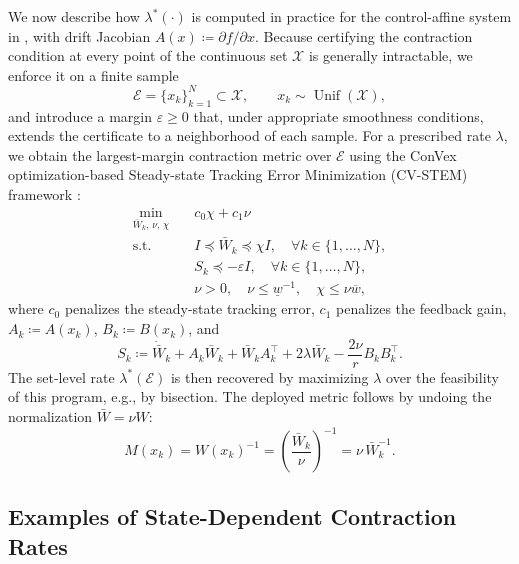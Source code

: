 \documentclass[lettersize,journal]{IEEEtran}
\begin{document}
We now describe how $\lambda^*(\cdot)$ is computed in practice for the
control-affine system in , with drift Jacobian
$A(x)\coloneq\partial f/\partial x$. Because certifying the contraction
condition at every point of the continuous set $\mathcal{X}$ is generally
intractable, we enforce it on a finite sample
\begin{equation}
    \mathcal{E} = \{x_k\}_{k=1}^{N}\subset\mathcal{X},
    \qquad
    x_k\sim\operatorname{Unif}(\mathcal{X}),
\end{equation}
and introduce a margin $\varepsilon\geq0$ that, under appropriate smoothness
conditions, extends the certificate to a neighborhood of each sample. For a
prescribed rate $\lambda$, we obtain the largest-margin contraction metric over
$\mathcal{E}$ using the ConVex optimization-based Steady-state Tracking Error
Minimization (CV-STEM) framework \cite{tsukamoto2020robust}:
\begin{align}
    \min_{\bar{W}_k,\,\nu,\,\chi} \quad & c_0\chi + c_1\nu \label{eqn:cvstem1}\\
    \text{s.t.} \quad & I \preceq \bar{W}_k \preceq \chi I, \quad \forall k \in \{1,\dots,N\}, \label{eqn:cvstem2}\\
    & S_k \preceq -\varepsilon I, \quad \forall k \in \{1,\dots,N\}, \label{eqn:cvstem3}\\
    & \nu > 0, \quad \nu \leq \underline{w}^{-1}, \quad \chi \leq \nu \overline{w},\label{eqn:cvstem4}
\end{align}
where $c_0$ penalizes the steady-state tracking error, $c_1$ penalizes the
feedback gain, $A_k\coloneq A(x_k)$, $B_k\coloneq B(x_k)$, and
\begin{equation}
    S_k \coloneq \dot{\bar{W}}_k + A_k \bar{W}_k + \bar{W}_k A_k^\top
    + 2\lambda \bar{W}_k - \frac{2\nu}{r}B_k B_k^\top.
\end{equation}
The set-level rate $\lambda^*(\mathcal{E})$ is then recovered by maximizing
$\lambda$ over the feasibility of this program, e.g., by bisection. The deployed
metric follows by undoing the normalization $\bar{W}=\nu W$:
\begin{equation}
    M(x_k) = W(x_k)^{-1} = \left(\frac{\bar{W}_k}{\nu}\right)^{-1} = \nu\,\bar{W}_k^{-1}.
\end{equation}


\subsection{Examples of State-Dependent Contraction Rates}
\label{sec:state_dependent_examples}
\end{document}
